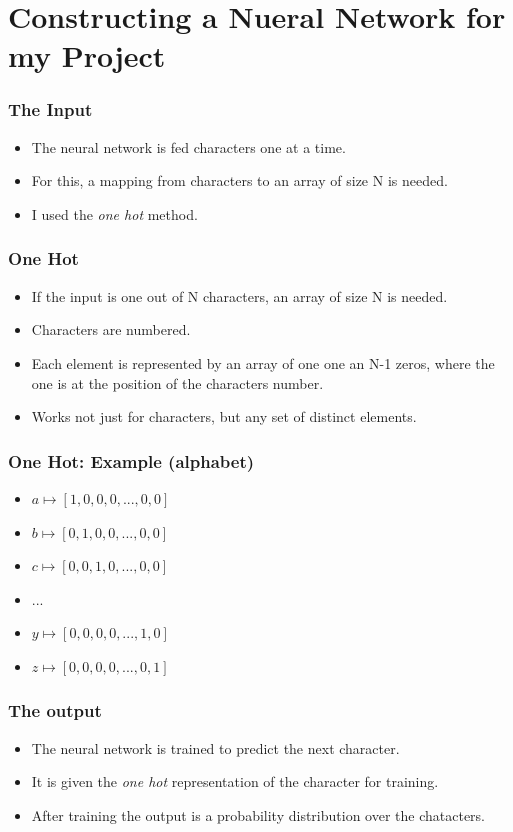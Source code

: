 \documentclass[12]{beamer}
\begin{document}
\section{Constructing a Nueral Network for my Project}
\begin{frame}
\frametitle{The Input}
\begin{itemize}
\item<1-> The neural network is fed characters one at a time.
\item<1-> For this, a mapping from characters to an array of size N is needed.
\item<1-> I used the \textit{one hot} method.
\end{itemize}
\end{frame}

\begin{frame}
\frametitle{One Hot}
\begin{itemize}
\item<1-> If the input is one out of N characters, an array of size N is needed.
\item<1-> Characters are numbered.
\item<1-> Each element is represented by an array of one one an N-1 zeros, where the one is at the position of the characters number.
\item<1-> Works not just for characters, but any set of distinct elements.
\end{itemize}
\end{frame}

\begin{frame}
\frametitle{One Hot: Example (alphabet)}
\begin{itemize}
\item<1-> $a \longmapsto [1,0,0,0,...,0,0]$
\item<1-> $b \longmapsto [0,1,0,0,...,0,0]$
\item<1-> $c \longmapsto [0,0,1,0,...,0,0]$
\item<1-> $...$
\item<1-> $y \longmapsto [0,0,0,0,...,1,0]$
\item<1-> $z \longmapsto [0,0,0,0,...,0,1]$
\end{itemize}
\end{frame}

\begin{frame}
\frametitle{The output}
\begin{itemize}
\item<1-> The neural network is trained to predict the next character.
\item<1-> It is given the \textit{one hot} representation of the character for training.
\item<1-> After training the output is a probability distribution over the chatacters.
\end{itemize}
\end{frame}
\end{document}
